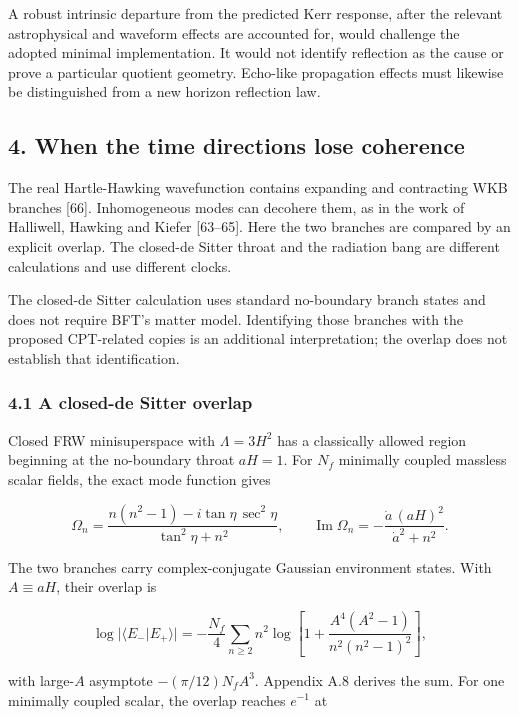 \documentclass[
]{article}
\begin{document}
A robust intrinsic departure from the predicted Kerr response, after the
relevant astrophysical and waveform effects are accounted for, would
challenge the adopted minimal implementation. It would not identify
reflection as the cause or prove a particular quotient geometry.
Echo-like propagation effects must likewise be distinguished from a new
horizon reflection law.

\subsection{4. When the time directions lose
coherence}\label{when-the-time-directions-lose-coherence}

The real Hartle-Hawking wavefunction contains expanding and contracting
WKB branches {[}66{]}. Inhomogeneous modes can decohere them, as in the
work of Halliwell, Hawking and Kiefer {[}63--65{]}. Here the two
branches are compared by an explicit overlap. The closed-de Sitter
throat and the radiation bang are different calculations and use
different clocks.

The closed-de Sitter calculation uses standard no-boundary branch states
and does not require BFT's matter model. Identifying those branches with
the proposed CPT-related copies is an additional interpretation; the
overlap does not establish that identification.

\subsubsection{4.1 A closed-de Sitter
overlap}\label{a-closed-de-sitter-overlap}

Closed FRW minisuperspace with \(\Lambda=3H^2\) has a classically
allowed region beginning at the no-boundary throat \(aH=1\). For \(N_f\)
minimally coupled massless scalar fields, the exact mode function gives

\[
\Omega_n=
\frac{n(n^2-1)-i\tan\eta\,\sec^2\eta}{\tan^2\eta+n^2},
\qquad
\operatorname{Im}\Omega_n=
-\frac{\dot a\,(aH)^2}{\dot a^2+n^2}.
\]

The two branches carry complex-conjugate Gaussian environment states.
With \(A\equiv aH\), their overlap is

\[
\log|\langle E_-|E_+\rangle|
=-\frac{N_f}{4}\sum_{n\ge2}n^2
\log\!\left[
1+\frac{A^4(A^2-1)}{n^2(n^2-1)^2}
\right],
\]

with large-\(A\) asymptote \(-(\pi/12)N_fA^3\). Appendix A.8 derives the
sum. For one minimally coupled scalar, the overlap reaches \(e^{-1}\) at
\end{document}
